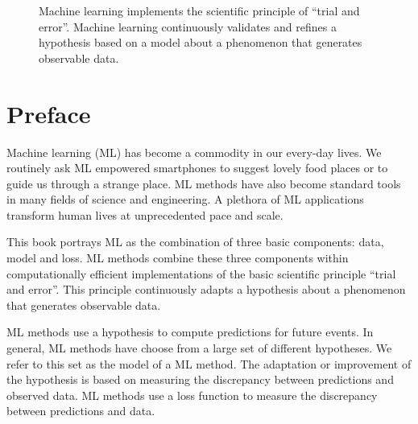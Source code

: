 \documentclass[12pt]{report}
\begin{document}
\begin{center}
\begin{figure}[htbp]
	\vspace*{-9mm}
	\caption{
		Machine learning implements the scientific principle of ``trial and error''. 
		Machine learning continuously validates and refines a hypothesis based on 
		a model about a phenomenon that generates observable data.}
	\label{fig_AlexMLBP}
\end{figure}
\end{center}



\newpage
\chapter*{Preface}

Machine learning (ML) has become a commodity in our every-day lives. 
We routinely ask ML empowered smartphones to suggest lovely food 
places or to guide us through a strange place. ML methods have also 
become standard tools in many fields of science and engineering. A 
plethora of ML applications transform human lives at unprecedented 
pace and scale. 

This book portrays ML as the combination of three basic components: 
data, model and loss. ML methods combine these three components 
within computationally efficient implementations of the basic scientific 
principle ``trial and error''. This principle continuously adapts a hypothesis 
about a phenomenon that generates observable data. 

ML methods use a hypothesis to compute predictions for future events. 
In general, ML methods have choose from a large set of different hypotheses. 
We refer to this set as the model of a ML method. The adaptation or 
improvement of the hypothesis is based on measuring the discrepancy 
between predictions and observed data. ML methods use a loss function 
to measure the discrepancy between predictions and data.
\end{document}
